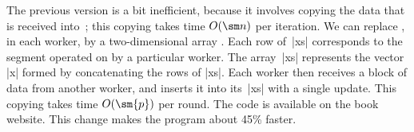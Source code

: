 The previous version is a bit inefficient, because it involves copying the
data that is received into~; this copying takes time $O(\sm n)$ per iteration.  We
can replace , in each worker, by a two-dimensional array .
Each row of~|xs| corresponds to the segment operated on by a particular
worker.  The array~|xs| represents the vector |x| formed by concatenating the
rows of |xs|. 
Each worker then receives a block of data from another worker, and inserts it
into its~|xs| with a single update.  This copying takes time $O(\sm{p})$ per
round.  The code is available on the book website.  This change makes the
program about 45\% faster.
